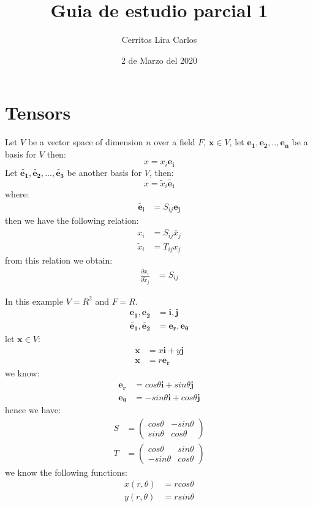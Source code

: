 \documentclass{article}
\title{Guia de estudio parcial 1}
\author{Cerritos Lira Carlos}
\date{2 de Marzo del 2020}
\begin{document}
\maketitle
\section*{Tensors}
Let $V$ be a vector space of dimension $n$ over a field $F$, $\bm{x} \in V$, 
let $\bm{e_1,e_2,..,e_n}$ be a basis for $V$ then:
\[ x = x_i \bm{e_i} \]
Let $\bm{\tilde{e_1}, \tilde{e_2},...,\tilde{e_3}}$ be another basis for $V$, then:
\[ x = \tilde{x}_i \bm{\tilde{e_i}} \]
where:
\begin{align*}
    \bm{\tilde{e_i}} &= S_{ij} \bm{e_j} 
\end{align*}
then we have the following relation:
\begin{align*}
    x_i &= S_{ij}\tilde{x_j} \\
    \tilde{x}_i &= T_{ij}x_j
\end{align*}
from this relation we obtain:
\begin{align*}
    \frac{\partial x_i}{\partial \tilde{x}_j} 
    &= S_{ij}
\end{align*}

\begin{tcolorbox}
    In this example $V=R^2$ and $F=R$.
    \begin{align*}
        \bm{e_1,e_2} &= \bm{i,j} \\
        \bm{\tilde{e_1}, \tilde{e_2}} &= \bm{e_r,e_\theta}      
    \end{align*}
   let $\bm{x} \in V$:
   \begin{align*}
       \bm{x} &= x\bm{i} + y\bm{j} \\
       \bm{x} &= r\bm{e_r}
   \end{align*}
   we know:
   \begin{align*}
       \bm{e_r} &= cos\theta \bm{i} + sin\theta \bm{j} \\
       \bm{e_\theta} &= -sin\theta \bm{i} + cos\theta \bm{j}
   \end{align*}
   hence we have:
   \begin{align*}
        S 
        &= \left( \begin{matrix} 
        cos\theta & -sin\theta \\ 
        sin\theta & cos\theta 
        \end{matrix} \right) 
        \\
        T
        &= \left( \begin{matrix} 
        cos\theta & sin\theta \\ 
        -sin\theta & cos\theta 
        \end{matrix} \right)
   \end{align*} 
   we know the following functions:
   \begin{align*}
        x(r,\theta)
        &= rcos\theta \\
        y(r,\theta)
        &= rsin\theta
   \end{align*}

\end{tcolorbox}
\end{document}
